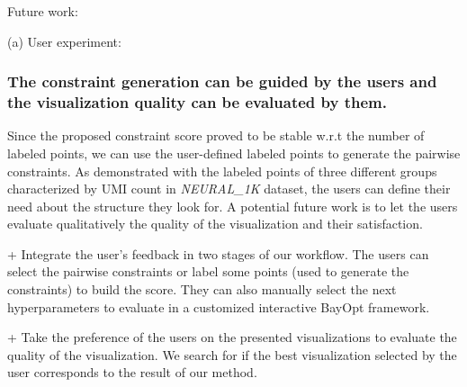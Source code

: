 Future work:

(a) User experiment:
\subsubsection*{The constraint generation can be guided by the users and the visualization quality can be evaluated by them.}
Since the proposed constraint score proved to be stable w.r.t the number of labeled points,
we can use the user-defined labeled points to generate the pairwise constraints.
As demonstrated with the labeled points of three different groups characterized by UMI count in \emph{NEURAL\_1K} dataset, the users can define their need about the structure they look for.
A potential future work is to let the users evaluate qualitatively the quality of the visualization and their satisfaction.

+ Integrate the user's feedback in two stages of our workflow.
The users can select the pairwise constraints or label some points (used to generate the constraints) to build the score.
They can also manually select the next hyperparameters to evaluate in a customized interactive BayOpt framework.

+ Take the preference of the users on the presented visualizations to evaluate the quality of the visualization. We search for if the best visualization selected by the user corresponds to the result of our method.





